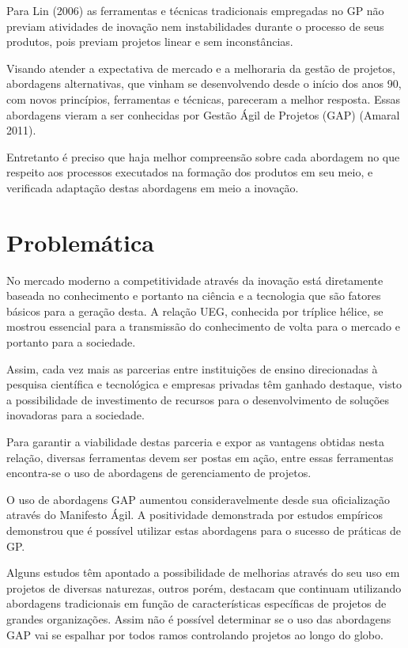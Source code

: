 Para Lin (2006) as ferramentas e técnicas tradicionais empregadas no GP não previam atividades de inovação nem instabilidades durante o processo de seus produtos, pois previam projetos linear e sem inconstâncias.

Visando atender a expectativa de mercado e a melhoraria da gestão de projetos, abordagens alternativas, que vinham se desenvolvendo desde o início dos anos 90, com novos princípios, ferramentas e técnicas, pareceram a melhor resposta. Essas abordagens vieram a ser conhecidas por Gestão Ágil de Projetos (GAP) (Amaral 2011).

Entretanto é preciso que haja melhor compreensão sobre cada abordagem no que respeito aos processos executados na formação dos produtos em seu meio, e verificada adaptação destas abordagens em meio a inovação.

\section{Problemática}

No mercado moderno a competitividade através da inovação está diretamente baseada no conhecimento e portanto na ciência e a tecnologia que são fatores básicos para a geração desta. A relação UEG, conhecida por tríplice hélice, se mostrou essencial para a transmissão do conhecimento de volta para o mercado e portanto para a sociedade.

Assim, cada vez mais as parcerias entre instituições de ensino direcionadas à pesquisa científica e tecnológica e empresas privadas têm ganhado destaque, visto a possibilidade de investimento de recursos para o desenvolvimento de soluções inovadoras para a sociedade.

Para garantir a viabilidade destas parceria e expor as vantagens obtidas nesta relação, diversas ferramentas devem ser postas em ação, entre essas ferramentas encontra-se o uso de abordagens de gerenciamento de projetos.

O uso de abordagens GAP aumentou consideravelmente desde sua oficialização através do Manifesto Ágil. A positividade demonstrada por estudos empíricos demonstrou que é possível utilizar estas abordagens para o sucesso de práticas de GP.

Alguns estudos têm apontado a possibilidade de melhorias através do seu uso em projetos de diversas naturezas, outros porém, destacam que continuam utilizando abordagens tradicionais em função de características específicas de projetos de grandes organizações. Assim não é possível determinar se o uso das abordagens GAP vai se espalhar por todos ramos controlando projetos ao longo do globo.

